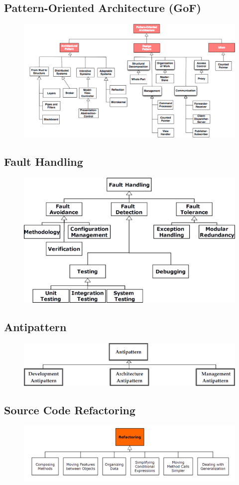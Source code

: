 \subsection{Pattern-Oriented Architecture (GoF)}
\begin{figure}[H]
  \centering
  \includegraphics[width=.85\linewidth]{images/taxonomies_pattern_oriented_architecture.png}
\end{figure}

\subsection{Fault Handling}
\begin{figure}[H]
  \centering
  \includegraphics[width=.85\linewidth]{images/taxonomies_fault_handling.png}
\end{figure}

\subsection{Antipattern}
\begin{figure}[H]
  \centering
  \includegraphics[width=.85\linewidth]{images/taxonomies_antipattern.png}
\end{figure}

\subsection{Source Code Refactoring}
\begin{figure}[H]
  \centering
  \includegraphics[width=.85\linewidth]{images/taxonomies_source_code_refactoring.png}
\end{figure}

